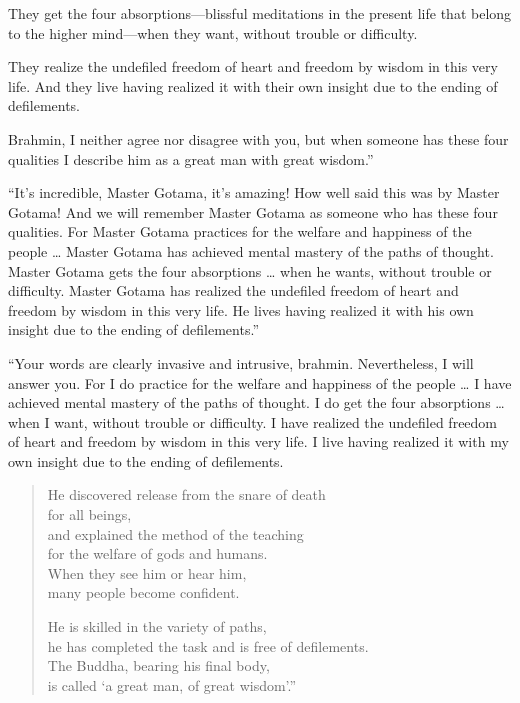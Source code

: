 \documentclass[12pt,openany]{book}%
\begin{document}
They get the four absorptions—blissful meditations in the present life that belong to the higher mind—when they want, without trouble or difficulty. 

They realize the undefiled freedom of heart and freedom by wisdom in this very life. And they live having realized it with their own insight due to the ending of defilements. 

Brahmin, I neither agree nor disagree with you, but when someone has these four qualities I describe him as a great man with great wisdom.” 

“It’s incredible, Master Gotama, it’s amazing! How well said this was by Master Gotama! And we will remember Master Gotama as someone who has these four qualities. For Master Gotama practices for the welfare and happiness of the people … Master Gotama has achieved mental mastery of the paths of thought. Master Gotama gets the four absorptions … when he wants, without trouble or difficulty. Master Gotama has realized the undefiled freedom of heart and freedom by wisdom in this very life. He lives having realized it with his own insight due to the ending of defilements.” 

“Your words are clearly invasive and intrusive, brahmin. Nevertheless, I will answer you. For I do practice for the welfare and happiness of the people … I have achieved mental mastery of the paths of thought. I do get the four absorptions … when I want, without trouble or difficulty. I have realized the undefiled freedom of heart and freedom by wisdom in this very life. I live having realized it with my own insight due to the ending of defilements. 

\begin{verse}%
He discovered release from the snare of death \\
for all beings, \\
and explained the method of the teaching \\
for the welfare of gods and humans. \\
When they see him or hear him, \\
many people become confident. 

He is skilled in the variety of paths, \\
he has completed the task and is free of defilements. \\
The Buddha, bearing his final body, \\
is called ‘a great man, of great wisdom’.” 

%
\end{verse}
\end{document}
